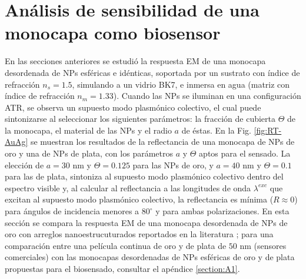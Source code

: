 \section{Análisis de sensibilidad  de una monocapa como biosensor}
\label{section:sensLambda}

En las secciones anteriores se estudió la respuesta EM de una monocapa desordenada de NPs esféricas e idénticas, soportada por un sustrato con índice de refracción $n_s=1.5$, simulando a un vidrio BK7, e inmersa en agua (matriz con índice de refracción $n_m=1.33$). Cuando las NPs se iluminan en una configuración ATR, se observa un supuesto modo  plasmónico colectivo, el cual puede sintonizarse al seleccionar los siguientes parámetros: la fracción de cubierta $\Theta$ de la monocapa, el material de las NPs y el radio $a$ de éstas. En la Fig. \ref{fig:RT-AuAg} se muestran los resultados de la reflectancia de una monocapa de NPs de oro y una de NPs de plata, con los parámetros $a$ y $\Theta$ aptos para el sensado. La elección de $a=30$ nm y $\Theta=0.125$ para las NPs de oro, y $a=40$ nm y $\Theta=0.1$ para las de plata, sintoniza al supuesto modo  plasmónico colectivo dentro del espectro visible y, al calcular al reflectancia a las longitudes de onda $\lambda^{exc}$ que excitan al supuesto modo  plasmónico colectivo, la reflectancia es mínima ($R\approx 0$) para ángulos de incidencia menores a $80^\circ$ y para ambas polarizaciones. En esta sección se compara la respuesta EM de una monocapa desordenada de NPs de oro con arreglos nanoestrucuturados reportados en la literatura \cite{danilov2018ultra,svedendahl2009refractometric}; para una comparación entre una película continua de oro y de plata de $50$ nm (sensores comerciales) con las monocapas desordenadas de NPs esféricas de oro y de plata propuestas para el biosensado, consultar el apéndice \ref{section:A1}.


